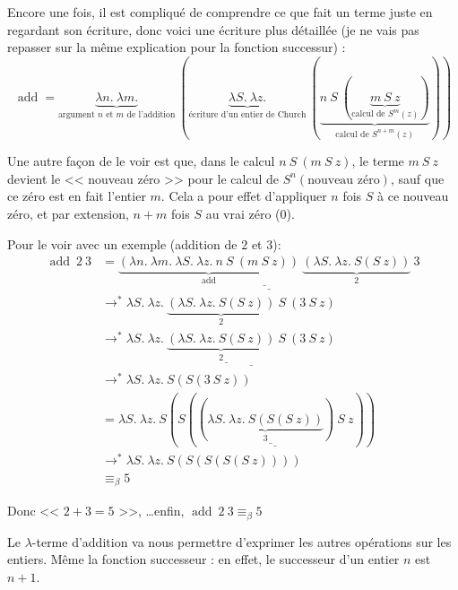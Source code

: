 \documentclass[11pt]{article}
\begin{document}
Encore une fois, il est compliqué de comprendre ce que fait un terme juste en regardant son écriture, donc voici une écriture plus détaillée (je ne vais pas repasser sur la même explication pour la fonction successur) :
$$\operatorname{add} = \underbrace{\lambda n.~\lambda m.}_\text{argument $n$ et $m$ de l'addition}~\left(\underbrace{\lambda S.~\lambda z.}_\text{écriture d'un entier de Church}~\left(\underbrace{n~S~\left(\underbrace{m~S~z}_\text{calcul de $S^m(z)$}\right)}_\text{calcul de $S^{n+m}(z)$}\right)\right)$$

Une autre façon de le voir est que, dans le calcul $n~S~(m~S~z)$, le terme $m~S~z$ devient le << nouveau zéro >> pour le calcul de $S^n(\text{nouveau zéro})$, sauf que ce zéro est en fait l'entier $m$. Cela a pour effet d'appliquer $n$ fois $S$ à ce nouveau zéro, et par extension, $n + m$ fois $S$ au vrai zéro ($0$).

\begin{example}
    Pour le voir avec un exemple (addition de $2$ et $3$):
    \begin{equation*}
    \begin{aligned}
        \operatorname{add}~2~3&=\underline{\underline{\underbrace{\left(\lambda n.~\lambda m.~\lambda S.~\lambda z. ~ n~S~(m~S~z)\right)}_\text{add}~\underbrace{\left(\lambda S.~\lambda z.~ S(S~z)\right)}_2}~3}\\
        &\longrightarrow^* \lambda S.~\lambda z. ~ \underbrace{\left(\lambda S.~\lambda z.~ S(S~z)\right)}_2~S~(3~S~z)\\
        &\longrightarrow^* \lambda S.~\lambda z. ~ \underline{\underline{\underbrace{\left(\lambda S.~\lambda z.~ S(S~z)\right)}_2~S}~(3~S~z)}\\
        &\longrightarrow^*\lambda S.~\lambda z.~ S(S(3~S~z))\\
        &= \lambda S.~\lambda z.~ S(S(\underline{\underline{(\underbrace{\lambda S.~\lambda z.~S(S(S~z))}_3)~S}~z}))\\
        &\longrightarrow^* \lambda S.~\lambda z.~S(S(S(S(S~z))))\\
        &\equiv_\beta 5
    \end{aligned}
    \end{equation*}
    
    Donc << $2+3=5$ >>, \dots enfin, $\operatorname{add}~2~3\equiv_\beta 5$
\end{example}

Le $\lambda$-terme d'addition va nous permettre d'exprimer les autres opérations sur les entiers. Même la fonction successeur : en effet, le successeur d'un entier $n$ est $n + 1$.
\end{document}
